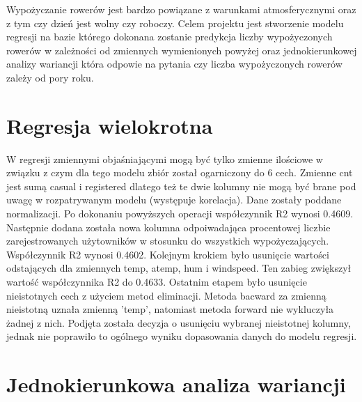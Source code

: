 \documentclass[12pt]{article}
\begin{document}
\hspace{7mm} Wypożyczanie rowerów jest bardzo powiązane z warunkami atmosferycznymi oraz z tym czy dzień jest wolny czy roboczy. Celem projektu jest stworzenie modelu regresji na bazie którego dokonana zostanie predykcja liczby wypożyczonych rowerów w zależności od zmiennych wymienionych powyżej oraz jednokierunkowej analizy wariancji która odpowie na pytania czy liczba wypożyczonych rowerów zależy od pory roku.
\section{Regresja wielokrotna}
W regresji zmiennymi objaśniającymi mogą być tylko zmienne ilościowe w związku z czym dla tego modelu zbiór został ogarniczony do 6 cech. Zmienne cnt jest sumą casual i registered dlatego też te dwie kolumny nie mogą być brane pod uwagę w rozpatrywanym modelu (występuje korelacja). Dane zostały poddane normalizacji. Po dokonaniu powyższych operacji współczynnik R2 wynosi 0.4609. Następnie dodana została nowa kolumna odpoiwadająca procentowej liczbie zarejestrowanych użytowników w stosunku do wszystkich wypożyczających. Współczynnik R2 wynosi 0.4602.
Kolejnym krokiem było usunięcie wartości odstających dla zmiennych temp, atemp, hum i windspeed. Ten zabieg zwiększył wartość współczynnika R2 do 0.4633.
Ostatnim etapem było usunięcie nieistotnych cech z użyciem metod eliminacji. Metoda bacward za zmienną nieistotną uznała zmienną 'temp', natomiast metoda forward nie wykluczyła żadnej z nich. Podjęta została decyzja o usunięciu wybranej nieistotnej kolumny, jednak nie poprawiło to ogólnego wyniku dopasowania danych do modelu regresji.
\section{Jednokierunkowa analiza wariancji}
\end{document}
